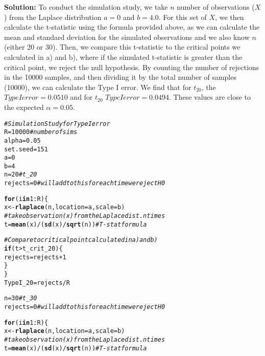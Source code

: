 \documentclass{article}\usepackage[]{graphicx}\usepackage[]{xcolor}
\makeatletter
\newcommand{\hlnum}[1]{\textcolor[rgb]{0.686,0.059,0.569}{#1}}%
\newcommand{\hlcom}[1]{\textcolor[rgb]{0.678,0.584,0.686}{\textit{#1}}}%
\newcommand{\hlopt}[1]{\textcolor[rgb]{0,0,0}{#1}}%
\newcommand{\hldef}[1]{\textcolor[rgb]{0.345,0.345,0.345}{#1}}%
\newcommand{\hlkwa}[1]{\textcolor[rgb]{0.161,0.373,0.58}{\textbf{#1}}}%
\newcommand{\hlkwb}[1]{\textcolor[rgb]{0.69,0.353,0.396}{#1}}%
\newcommand{\hlkwc}[1]{\textcolor[rgb]{0.333,0.667,0.333}{#1}}%
\newcommand{\hlkwd}[1]{\textcolor[rgb]{0.737,0.353,0.396}{\textbf{#1}}}%
\newenvironment{kframe}{%
 \def\at@end@of@kframe{}%
 \ifinner\ifhmode%
  \def\at@end@of@kframe{\end{minipage}}%
  \begin{minipage}{\columnwidth}%
 \fi\fi%
 \def\FrameCommand##1{\hskip\@totalleftmargin \hskip-\fboxsep
 \colorbox{shadecolor}{##1}\hskip-\fboxsep
     \hskip-\linewidth \hskip-\@totalleftmargin \hskip\columnwidth}%
 \MakeFramed {\advance\hsize-\width
   \@totalleftmargin\z@ \linewidth\hsize
   \@setminipage}}%
 {\par\unskip\endMakeFramed%
 \at@end@of@kframe}
\newenvironment{knitrout}{}{} %
\makeatother
\begin{document}
\begin{enumerate}
\begin{enumerate}
  
  \textbf{Solution:} To conduct the simulation study, we take $n$ number of observations ($X$) from the Laplace distribution $a = 0$ and $b = 4.0$. For this set of $X$, we then calculate the t-statistic using the formula provided above, as we can calculate the mean and standard deviation for the simulated observations and we also know $n$ (either 20 or 30). Then, we compare this t-statistic to the critical points we calculated in a) and b), where if the simulated t-statistic is greater than the critical point, we reject the null hypothesis. By counting the number of rejections in the 10000 samples, and then dividing it by the total number of samples (10000), we can calculate the Type I error. We find that for $t_{20}$, the $Type I error = 0.0510$ and for $t_{20}$ $Type I error = 0.0494$. These values are close to the expected $\alpha = 0.05$. 
\begin{knitrout}\scriptsize
{}\color{fgcolor}\begin{kframe}
\begin{alltt}
\hlcom{#Simulation Study for Type I error}
\hldef{R} \hlkwb{=} \hlnum{10000} \hlcom{#number of sims}
\hldef{alpha} \hlkwb{=} \hlnum{0.05}
\hldef{set.seed} \hlkwb{=} \hlnum{151}
\hldef{a} \hlkwb{=} \hlnum{0}
\hldef{b} \hlkwb{=} \hlnum{4}
\hldef{n} \hlkwb{=} \hlnum{20} \hlcom{#t_20}
\hldef{rejects} \hlkwb{=} \hlnum{0} \hlcom{#will add to this for each time we reject H0}

\hlkwa{for} \hldef{(i} \hlkwa{in} \hlnum{1}\hlopt{:}\hldef{R) \{}
\hldef{x} \hlkwb{<-} \hlkwd{rlaplace}\hldef{(n,} \hlkwc{location} \hldef{= a,} \hlkwc{scale} \hldef{= b)}
\hlcom{#take observation (x) from the Laplace dist. n times}
\hldef{t} \hlkwb{=} \hlkwd{mean}\hldef{(x)} \hlopt{/} \hldef{(}\hlkwd{sd}\hldef{(x)} \hlopt{/} \hlkwd{sqrt}\hldef{(n))} \hlcom{#T-stat formula}

\hlcom{#Compare to critical point calculated in a) and b)}
\hlkwa{if} \hldef{(t} \hlopt{>} \hldef{t_crit_20)\{}
  \hldef{rejects} \hlkwb{=} \hldef{rejects} \hlopt{+} \hlnum{1}
\hldef{\}}
\hldef{\}}
\hldef{TypeI_20} \hlkwb{=} \hldef{rejects}\hlopt{/}\hldef{R}

\hldef{n} \hlkwb{=} \hlnum{30} \hlcom{#t_30}
\hldef{rejects} \hlkwb{=} \hlnum{0} \hlcom{#will add to this for each time we reject H0}

\hlkwa{for} \hldef{(i} \hlkwa{in} \hlnum{1}\hlopt{:}\hldef{R) \{}
\hldef{x} \hlkwb{<-} \hlkwd{rlaplace}\hldef{(n,} \hlkwc{location} \hldef{= a,} \hlkwc{scale} \hldef{= b)}
\hlcom{#take observation (x) from the Laplace dist. n times}
\hldef{t} \hlkwb{=} \hlkwd{mean}\hldef{(x)} \hlopt{/} \hldef{(}\hlkwd{sd}\hldef{(x)} \hlopt{/} \hlkwd{sqrt}\hldef{(n))} \hlcom{#T-stat formula}


\end{alltt}
\end{kframe}
\end{knitrout}
\end{enumerate}
\end{enumerate}
\end{document}
